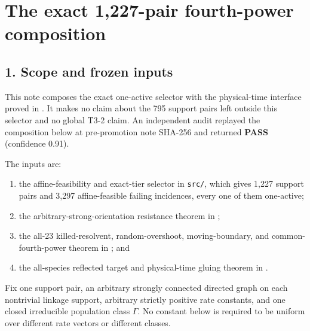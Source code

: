 \section{The exact 1,227-pair fourth-power
composition}

\subsection{1. Scope and frozen inputs}

This note composes the exact one-active selector with the physical-time
interface proved in
\texttt{}.
It makes no claim about the 795 support pairs left outside this selector
and no global T3-2 claim. An independent audit replayed the composition
below at pre-promotion note SHA-256
\texttt{}
and returned \textbf{PASS} (confidence 0.91).

The inputs are:

\begin{enumerate}
\def\labelenumi{\arabic{enumi}.}
\tightlist
\item
  the affine-feasibility and exact-tier selector in
  \texttt{src/\texttt{}}, which gives 1,227 support
  pairs and 3,297 affine-feasible failing incidences, every one of them
  one-active;
\item
  the arbitrary-strong-orientation resistance theorem in
  \texttt{};
\item
  the all-23 killed-resolvent, random-overshoot, moving-boundary, and
  common-fourth-power theorem in
  \texttt{};
  and
\item
  the all-species reflected target and physical-time gluing theorem in
  \texttt{}.
\end{enumerate}

Fix one support pair, an arbitrary strongly connected directed graph on
each nontrivial linkage support, arbitrary strictly positive rate
constants, and one closed irreducible population class \(\Gamma\). No
constant below is required to be uniform over different rate vectors or
different classes.

